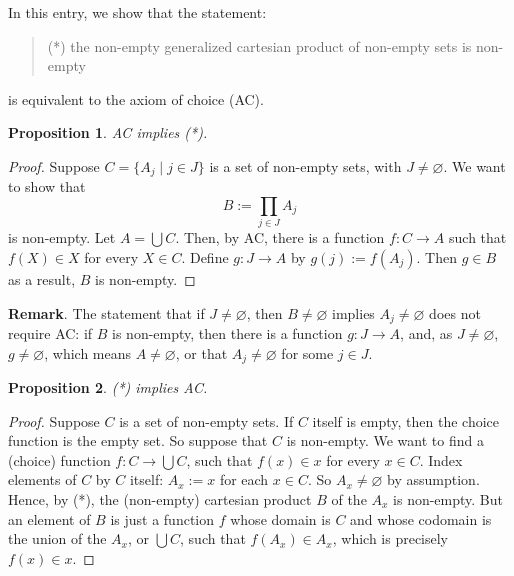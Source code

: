 \documentclass[12pt]{article}
\newtheorem{prop}{Proposition}
\begin{document}
In this entry, we show that the statement: 
\begin{quote}
(*) the non-empty generalized cartesian product of non-empty sets is non-empty
\end{quote}
is equivalent to the axiom of choice (AC).

\begin{prop} AC implies (*). \end{prop}
\begin{proof}  Suppose $C=\lbrace A_j\mid j\in J\rbrace$ is a set of non-empty sets, with $J\ne \varnothing$.  We want to show that $$B:=\prod_{j\in J} A_j$$ is non-empty.  Let $A = \bigcup C$.  Then, by AC, there is a function $f:C\to A$ such that $f(X)\in X$ for every $X\in C$.  Define $g:J \to A$ by $g(j):=f(A_j)$.  Then $g\in B$ as a result, $B$ is non-empty.
\end{proof}

\textbf{Remark}.  The statement that if $J\ne \varnothing$, then $B\ne \varnothing$ implies $A_j\ne \varnothing$ does not require AC: if $B$ is non-empty, then there is a function $g:J\to A$, and, as $J\ne \varnothing$, $g\ne \varnothing$, which means $A\ne \varnothing$, or that $A_j\ne \varnothing$ for some $j\in J$.

\begin{prop} (*) implies AC. \end{prop}
\begin{proof}  Suppose $C$ is a set of non-empty sets.  If $C$ itself is empty, then the choice function is the empty set.  So suppose that $C$ is non-empty.  We want to find a (choice) function $f: C\to \bigcup C$, such that $f(x)\in x$ for every $x\in C$.  Index elements of $C$ by $C$ itself: $A_x:=x$ for each $x\in C$.  So $A_x\ne \varnothing$ by assumption.  Hence, by (*), the (non-empty) cartesian product $B$ of the $A_x$ is non-empty.  But an element of $B$ is just a function $f$ whose domain is $C$ and whose codomain is the union of the $A_x$, or $\bigcup C$, such that $f(A_x)\in A_x$, which is precisely $f(x)\in x$.
\end{proof}
\end{document}
